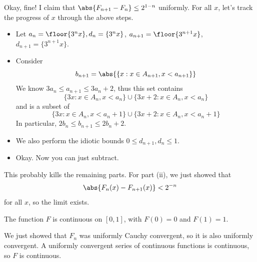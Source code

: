 \documentclass[11pt, headheight=30pt]{scrartcl}
\begin{document}





Okay, fine! I claim that $\abs{F_{n + 1} - F_n} \leq 2^{1-n}$ uniformly.
For all $x$, let's track the progress of $x$ through the above steps.
\begin{itemize}
    \item Let $a_n = \floor{3^nx}, d_n = \{3^nx\}$, $a_{n+1} = \floor{3^{n+1}x}$, $d_{n+1} = \{3^{n+1}x\}$.
    \item Consider
    \[
        b_{n+1} = \abs{\{x: x\in A_{n+1}, x < a_{n+1}\}}  
    \]
    We know $3a_n\leq a_{n+1}\leq 3a_n + 2$, thus this set
    contains
    \[
        \{3x: x\in A_n, x < a_n\}\cup \{3x + 2: x\in A_n, x < a_n\}
    \]
    and is a subset of
    \[
        \{3x: x\in A_n, x < a_n + 1\}\cup \{3x + 2: x\in A_n, x < a_n + 1\}
    \]
    In particular, $2b_n\leq b_{n+1}\leq 2b_n + 2$.
    \item We also perform the idiotic bounds $0\leq d_{n+1}, d_n \leq 1$.
    \item Okay. Now you can just subtract.
\end{itemize}

This probably kills the remaining parts. For part (ii),
we just showed that
\[
    \abs{F_n(x) - F_{n+1}(x)} < 2^{-n}
\]
for all $x$, so the limit exists.

\begin{prob}
    The function $F$ is continuous on $[0, 1]$, with $F(0) = 0$ and $F(1) = 1$.
\end{prob}
We just showed that $F_n$
was uniformly Cauchy convergent, so it is
also uniformly convergent. A uniformly convergent
series of continuous functions is continuous, so $F$ is continuous.
\end{document}
